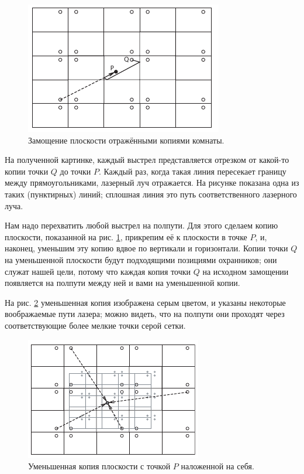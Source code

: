 \begin{figure}[b!]
\centering
\includegraphics[scale=1]{pics/room1}
\caption{Замощение плоскости отражёнными копиями комнаты.}
\label{pic:room1}
\end{figure}

На полученной картинке, каждый выстрел представляется отрезком от какой-то копии точки $Q$ до точки $P$.
Каждый раз, когда такая линия пересекает границу между прямоугольниками, лазерный луч отражается.
На рисунке показана одна из таких (пунктирных) линий; сплошная линия это путь соответственного лазерного луча.

Нам надо перехватить любой выстрел на полпути.
Для этого сделаем копию плоскости, показанной на рис. \ref{pic:room1}, прикрепим её к плоскости в точке $P$, и, наконец, уменьшим эту копию вдвое по вертикали и горизонтали.
Копии точки $Q$ на уменьшенной плоскости будут подходящими позициями охранников;
они служат нашей цели, потому что каждая копия точки $Q$ на исходном замощении появляется на полпути между ней и вами на уменьшенной копии.


На рис. \ref{pic:room2} уменьшенная копия изображена серым цветом, и указаны некоторые воображаемые пути лазера; можно видеть, что на полпути они проходят через соответствующие более мелкие точки серой сетки.

\begin{figure}[t!]
\centering
\includegraphics[scale=1]{pics/room2}
\caption{Уменьшенная копия плоскости с точкой $P$ наложенной на себя.}
\label{pic:room2}
\end{figure}

